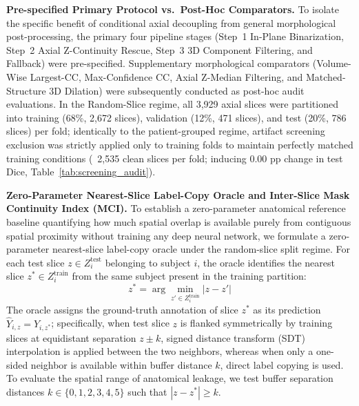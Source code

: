 \documentclass[11pt,a4paper]{article}
\begin{document}
\noindent\textbf{Pre-specified Primary Protocol vs.\ Post-Hoc Comparators.}
To isolate the specific benefit of conditional axial decoupling from general morphological post-processing, the primary four pipeline stages (Step~1 In-Plane Binarization, Step~2 Axial Z-Continuity Rescue, Step~3 3D Component Filtering, and Fallback) were pre-specified. Supplementary morphological comparators (Volume-Wise Largest-CC, Max-Confidence CC, Axial Z-Median Filtering, and Matched-Structure 3D Dilation) were subsequently conducted as post-hoc audit evaluations. In the Random-Slice regime, all 3,929 axial slices were partitioned into training (68\%, 2,672 slices), validation (12\%, 471 slices), and test (20\%, 786 slices) per fold; identically to the patient-grouped regime, artifact screening exclusion was strictly applied only to training folds to maintain perfectly matched training conditions (~2,535 clean slices per fold; inducing 0.00 pp change in test Dice, Table~\ref{tab:screening_audit}).

\noindent\textbf{Zero-Parameter Nearest-Slice Label-Copy Oracle and Inter-Slice Mask Continuity Index (MCI).}
To establish a zero-parameter anatomical reference baseline quantifying how much spatial overlap is available purely from contiguous spatial proximity without training any deep neural network, we formulate a zero-parameter nearest-slice label-copy oracle under the random-slice split regime. For each test slice $z \in Z_i^{\text{test}}$ belonging to subject $i$, the oracle identifies the nearest slice $z^* \in Z_i^{\text{train}}$ from the same subject present in the training partition:
\begin{equation}
z^* = \arg\min_{z' \in Z_i^{\text{train}}} |z - z'|
\end{equation}
The oracle assigns the ground-truth annotation of slice $z^*$ as its prediction $\hat{Y}_{i,z} = Y_{i,z^*}$; specifically, when test slice $z$ is flanked symmetrically by training slices at equidistant separation $z \pm k$, signed distance transform (SDT) interpolation is applied between the two neighbors, whereas when only a one-sided neighbor is available within buffer distance $k$, direct label copying is used. To evaluate the spatial range of anatomical leakage, we test buffer separation distances $k \in \{0, 1, 2, 3, 4, 5\}$ such that $|z - z^*| \ge k$.
\end{document}
